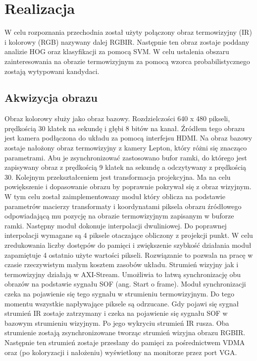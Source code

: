 \chapter{Realizacja}
W celu rozpoznania przechodnia został użyty połączony obraz termowizyjny (IR) i kolorowy (RGB) nazywany dalej RGBIR. Następnie ten obraz zostaje poddany analizie HOG oraz klasyfikacji za pomocą SVM. W celu ustalenia obszaru zainteresowania na obrazie termowizyjnym za pomocą wzorca probabilistycznego zostają wytypowani kandydaci.

\section{Akwizycja obrazu}
Obraz kolorowy służy jako obraz bazowy. Rozdzielczości 640 x 480 pikseli, prędkością 30 klatek na sekundę i głębi 8 bitów na kanał. Źródłem tego obrazu jest kamera podłączona do układu za pomocą interfejsu HDMI. Na obraz bazowy zostaje nałożony obraz termowizyjny z kamery Lepton, który różni się znacząco parametrami. Abu je zsynchronizować zastosowano bufor ramki, do którego jest zapisywany obraz z prędkością 9 klatek na sekundę a odczytywany z prędkością 30. Kolejnym przekształceniem jest transformacja projekcyjna. Ma na celu powiększenie i dopasowanie obrazu by poprawnie pokrywał się z obraz wizyjnym. W tym celu został zaimplementowany moduł który oblicza na podstawie parametrów macierzy transformaty i koordynatami piksela obrazu źródłowego odpowiadającą mu pozycję na obrazie termowizyjnym zapisanym w buforze ramki. Następny moduł dokonuje interpolacji dwuliniowej. Do poprawnej interpolacji wymagane są 4 piksele otaczające obliczony z projekcji punkt. W celu zredukowania liczby dostępów do pamięci i zwiększenie szybkość działania moduł zapamiętuje 4 ostatnio użyte wartości pikseli. Rozwiązanie to pozwala na pracę w czasie rzeczywistym małym kosztem zasobów układu.
Strumień wizyjny jak i termowizyjny działają w AXI-Stream. Umożliwia to łatwą synchronizację obu obrazów na podstawie sygnału SOF (ang. Start o frame). Moduł synchronizacji czeka na pojawienie się tego sygnału w strumieniu termowizyjnym. Do tego momentu wszystkie napływające piksele są odrzucane. Gdy pojawi się sygnał strumień IR zostaje zatrzymany i czeka na pojawienie się sygnału SOF w bazowym strumieniu wizyjnym. Po jego wykryciu strumień IR rusza. Oba strumienie zostają zsynchronizowane tworząc strumień wizyjna obrazu RGBIR. Następnie ten strumień zostaje przesłany do pamięci za pośrednictwem VDMA oraz (po koloryzacji i nałożeniu) wyświetlony na monitorze przez port VGA.

